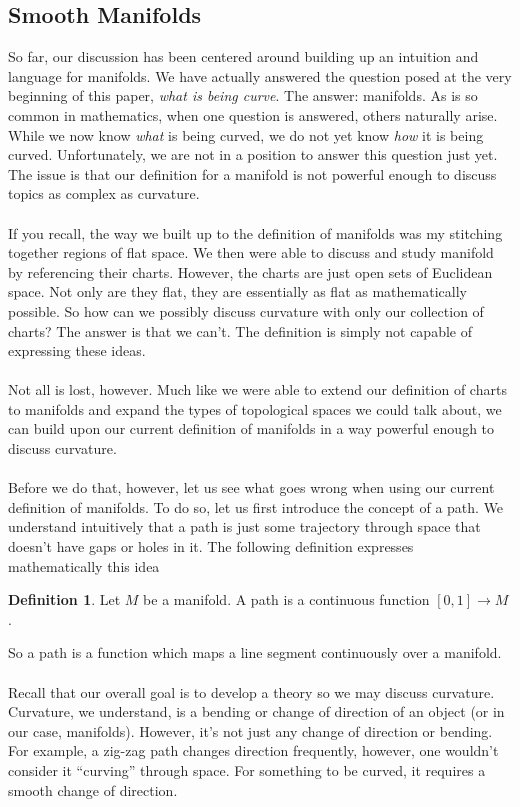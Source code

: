 \documentclass[]{article}
\newcommand\<{\ensuremath{\left\langle}}
\renewcommand\>{\ensuremath{\right\rangle}}
\theoremstyle{definition}
\newtheorem{definition}{Definition}[section]
\theoremstyle{definition}
\begin{document}
	
	\subsection*{Smooth Manifolds}
	So far, our discussion has been centered around building up an intuition and language for manifolds. We have actually answered the question posed at the very beginning of this paper, \textit{what is being curve}. The answer: manifolds. As is so common in mathematics, when one question is answered, others naturally arise. While we now know \textit{what} is being curved, we do not yet know \textit{how} it is being curved. Unfortunately, we are not in a position to answer this question just yet. The issue is that our definition for a manifold is not powerful enough to discuss topics as complex as curvature.\\
	\\
	If you recall, the way we built up to the definition of manifolds was my stitching together regions of flat space. We then were able to discuss and study manifold by referencing their charts. However, the charts are just open sets of Euclidean space. Not only are they flat, they are essentially as flat as mathematically possible. So how can we possibly discuss curvature with only our collection of charts? The answer is that we can't. The definition is simply not capable of expressing these ideas.\\
	\\
	Not all is lost, however. Much like we were able to extend our definition of charts to manifolds and expand the types of topological spaces we could talk about, we can build upon our current definition of manifolds in a way powerful enough to discuss curvature.\\
	\\
	Before we do that, however, let us see what goes wrong when using our current definition of manifolds. To do so, let us first introduce the concept of a path. We understand intuitively that a path is just some trajectory through space that doesn't have gaps or holes in it. The following definition expresses mathematically this idea
	\begin{definition}
		Let $M$ be a manifold. A path is a continuous function $[0, 1] \to M$.
	\end{definition}
	So a path is a function which maps a line segment continuously over a manifold.\\
	\\
	Recall that our overall goal is to develop a theory so we may discuss curvature. Curvature, we understand, is a bending or change of direction of an object (or in our case, manifolds). However, it's not just any change of direction or bending. For example, a zig-zag path changes direction frequently, however, one wouldn't consider it ``curving'' through space. For something to be curved, it requires a smooth change of direction. \\
\end{document}
